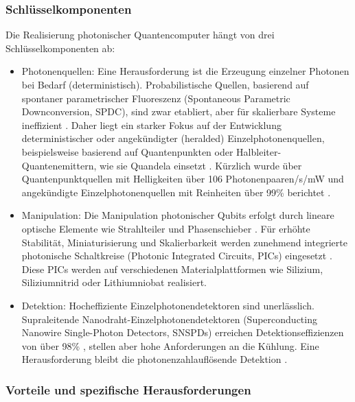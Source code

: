 \subsubsection{Schlüsselkomponenten}
Die Realisierung photonischer Quantencomputer hängt von drei Schlüsselkomponenten ab:
\begin{itemize}
    \item Photonenquellen: Eine Herausforderung ist die Erzeugung einzelner Photonen bei Bedarf (deterministisch). Probabilistische Quellen, basierend auf spontaner parametrischer Fluoreszenz (Spontaneous Parametric Downconversion, SPDC), sind zwar etabliert, aber für skalierbare Systeme ineffizient \cite{slussarenkoPhotonicQuantumInformation2019}. Daher liegt ein starker Fokus auf der Entwicklung deterministischer oder angekündigter (heralded) Einzelphotonenquellen, beispielsweise basierend auf Quantenpunkten \cite{LinearOpticsScalable} oder Halbleiter-Quantenemittern, wie sie Quandela einsetzt \cite{QuandelaAnnounces100000fold2025}. Kürzlich wurde über Quantenpunktquellen mit Helligkeiten über 106 Photonenpaaren/s/mW und angekündigte Einzelphotonenquellen mit Reinheiten über 99\% berichtet \cite{LinearOpticsScalable}.
    \item Manipulation: Die Manipulation photonischer Qubits erfolgt durch lineare optische Elemente wie Strahlteiler und Phasenschieber \cite{slussarenkoPhotonicQuantumInformation2019}. Für erhöhte Stabilität, Miniaturisierung und Skalierbarkeit werden zunehmend integrierte photonische Schaltkreise (Photonic Integrated Circuits, PICs) eingesetzt \cite{abughanemPhotonicQuantumComputers2024}. Diese PICs werden auf verschiedenen Materialplattformen wie Silizium, Siliziumnitrid oder Lithiumniobat realisiert.
    \item Detektion: Hocheffiziente Einzelphotonendetektoren sind unerlässlich. Supraleitende Nanodraht-Einzelphotonendetektoren (Superconducting Nanowire Single-Photon Detectors, SNSPDs) erreichen Detektionseffizienzen von über 98\% \cite{LinearOpticsScalable}, stellen aber hohe Anforderungen an die Kühlung. Eine Herausforderung bleibt die photonenzahlauflösende Detektion \cite{slussarenkoPhotonicQuantumInformation2019}.
\end{itemize}
\subsubsection{Vorteile und spezifische Herausforderungen}

